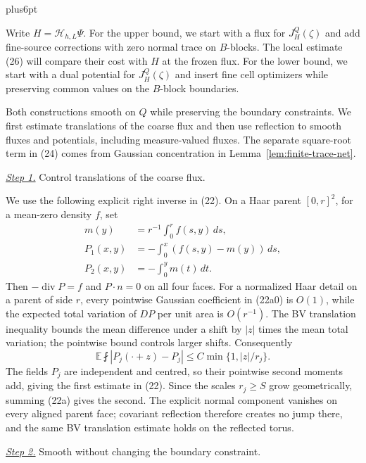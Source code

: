 \documentclass[11pt,reqno]{amsart}
\makeatletter
\theoremstyle{plain}
\theoremstyle{definition}
\theoremstyle{remark}
\renewenvironment{proof}[1][\proofname]{%
  \par
  \pushQED{\qed}%
  \normalfont
  \topsep6pt plus6pt\relax
  \trivlist
  \item[\hskip\labelsep\slshape #1\@addpunct{.}]%
  \ignorespaces
}{%
  \popQED
  \endtrivlist
  \@endpefalse
}
\DeclareRobustCommand{\qed}{%
  \leavevmode\unskip\penalty9999\hbox{}\nobreak
  \ifmmode
    \makebox[0pt][l]{\qquad\hbox{\qedsymbol}}%
  \else
    \qquad\hbox{\qedsymbol}%
  \fi
}
\renewcommand{\qedsymbol}{\rule[.47pt]{4pt}{6pt}}
\numberwithin{equation}{section}
\newcommand{\1}{\mathbf 1}
\makeatother
\begin{document}
\begin{proof}
Write $H=\mathcal H_{h,L}\Psi$.  For the upper bound, we start with a
flux for $J_H^Q(\zeta)$ and add fine-source corrections with zero normal
trace on $B$-blocks.  The local estimate (26) will compare their cost
with $H$ at the frozen flux.  For the lower bound, we start with a dual
potential for $J_H^Q(\zeta)$ and insert fine cell optimizers while
preserving common values on the $B$-block boundaries.

Both constructions smooth on $Q$ while preserving the boundary
constraints.  We first estimate translations of the coarse flux and
then use reflection to smooth fluxes and potentials, including
measure-valued fluxes.  The separate square-root term in (24) comes
from Gaussian concentration in Lemma~\ref{lem:finite-trace-net}.

\smallskip\noindent
\underline{\textit{Step 1.}} Control translations of the coarse flux.

We use the following explicit right inverse in (22).
On a Haar parent $[0,r]^2$, for a mean-zero density $f$, set
\begin{equation}
\begin{aligned}
m(y)&=r^{-1}\int_0^r f(s,y)\,ds,\\
P_1(x,y)&=-\int_0^x(f(s,y)-m(y))\,ds,\\
P_2(x,y)&=-\int_0^y m(t)\,dt.
\end{aligned}
\tag{22a0}
\end{equation}
Then $-\operatorname {div}P=f$ and $P\cdot n=0$ on all four
faces.  For a normalized Haar detail on a parent of side $r$, every
pointwise Gaussian coefficient in (22a0) is $O(1)$, while the expected
total variation of $DP$ per unit area is $O(r^{-1})$.
The BV translation inequality bounds the mean difference under a shift
by $|z|$ times the mean total variation; the pointwise bound controls
larger shifts.  Consequently
\begin{equation}
\mathbb E\fint|P_ j(\cdot+z)-P_ j|
\leq C\min\{1,|z|/r_ j\}.
\tag{22a}
\end{equation}
The fields $P_ j$ are independent and centred, so their pointwise
second moments add, giving the first estimate in (22).  Since the
scales $r_ j\geq S$ grow geometrically, summing (22a) gives the second.
The explicit normal component vanishes on every aligned parent face;
covariant reflection therefore creates no jump there, and the same
BV translation estimate holds on the reflected torus.

\smallskip\noindent
\underline{\textit{Step 2.}} Smooth without changing the boundary constraint.


\end{proof}
\end{document}
